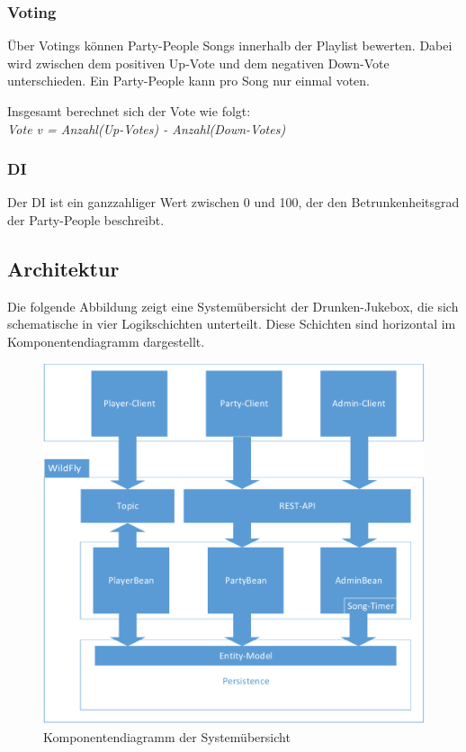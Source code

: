 \subsubsection{Voting}
Über Votings können Party-People Songs innerhalb der Playlist bewerten. Dabei wird zwischen dem positiven Up-Vote und dem negativen Down-Vote unterschieden. Ein Party-People kann pro Song nur einmal voten.

Insgesamt berechnet sich der Vote wie folgt:\\
\textit{Vote v = Anzahl(Up-Votes) - Anzahl(Down-Votes)}

\subsubsection{DI}
Der DI ist ein ganzzahliger Wert zwischen 0 und 100, der den Betrunkenheitsgrad der Party-People beschreibt.

\subsection{Architektur}

Die folgende Abbildung zeigt eine Systemübersicht der Drunken-Jukebox, die sich schematische in vier Logikschichten unterteilt. Diese Schichten sind horizontal im Komponentendiagramm dargestellt.

\begin{figure}[H]
	\centering
	\includegraphics[width=1\linewidth]{Bilder/Komponentendiagramm}
	\caption{Komponentendiagramm der Systemübersicht }
	\label{fig:Komponentendiagramm}
\end{figure}

